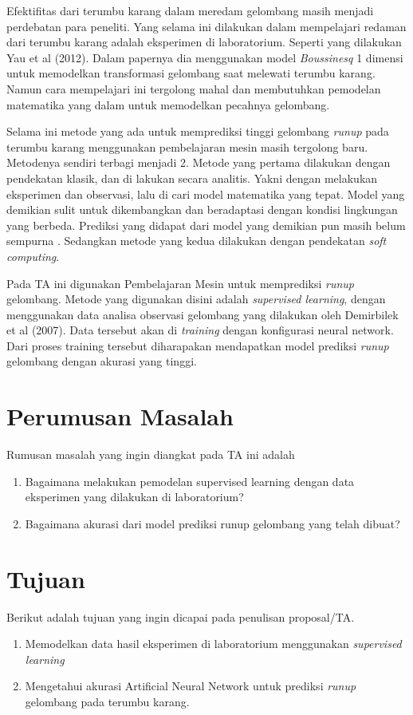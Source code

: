 Efektifitas dari terumbu karang dalam meredam gelombang masih menjadi perdebatan para peneliti. Yang selama ini dilakukan dalam mempelajari redaman dari terumbu karang adalah eksperimen di laboratorium. Seperti yang dilakukan Yau et al (2012)\cite{YAO201230}. Dalam papernya dia menggunakan model \emph{Boussinesq} 1 dimensi untuk memodelkan transformasi gelombang saat melewati terumbu karang.  Namun cara mempelajari ini tergolong mahal dan membutuhkan pemodelan matematika yang dalam untuk memodelkan pecahnya gelombang.

Selama ini metode yang ada untuk memprediksi tinggi gelombang \emph{runup} pada terumbu karang menggunakan pembelajaran mesin masih tergolong baru. Metodenya sendiri terbagi menjadi 2. Metode yang pertama dilakukan dengan pendekatan klasik, dan di lakukan secara analitis. Yakni dengan melakukan eksperimen dan observasi, lalu di cari model matematika yang tepat. Model yang demikian sulit untuk dikembangkan dan beradaptasi dengan kondisi lingkungan yang berbeda. Prediksi yang didapat dari model yang demikian pun masih belum sempurna \cite{DemirbilekBoussinesq}. Sedangkan metode yang kedua dilakukan dengan pendekatan \emph{soft computing}.

Pada TA ini digunakan Pembelajaran Mesin untuk memprediksi \emph{runup} gelombang. Metode yang digunakan disini adalah \emph{supervised learning}, dengan menggunakan data analisa observasi gelombang yang dilakukan oleh Demirbilek et al (2007)\cite{DemirbilekReport}. Data tersebut akan di \emph{training} dengan konfigurasi neural network. Dari proses training tersebut diharapakan mendapatkan model prediksi \emph{runup} gelombang dengan akurasi yang tinggi.

\section{Perumusan Masalah}
Rumusan masalah yang ingin diangkat pada TA ini adalah
\begin{enumerate}
    \item Bagaimana melakukan pemodelan supervised learning dengan data eksperimen yang dilakukan di laboratorium?
    \item Bagaimana akurasi dari model prediksi runup gelombang yang telah dibuat?
\end{enumerate}
\section{Tujuan}
Berikut adalah tujuan yang ingin dicapai pada penulisan proposal/TA.
\begin{enumerate}
    \item Memodelkan data hasil eksperimen di laboratorium menggunakan \emph{supervised learning}
    \item Mengetahui akurasi Artificial Neural Network untuk prediksi \emph{runup} gelombang pada terumbu karang.
\end{enumerate}
